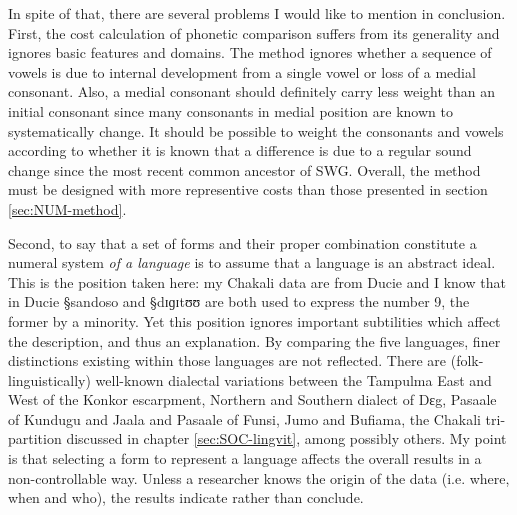 In spite of that, there are several problems I would like to mention in
conclusion.   First, the cost
calculation of phonetic comparison suffers from its generality and ignores
basic features and domains. The method ignores 
whether a sequence of vowels is due to internal
development from a single vowel or loss of a medial consonant.  Also,  a
medial consonant
should definitely carry less weight than an initial consonant since  many
consonants in medial position are known to systematically change. It should be
possible to weight the consonants and vowels according to whether it is known
that
a difference is due to a regular sound change since the most recent common
ancestor of SWG.  Overall, the method must be designed with 
more representive  costs than those presented in section \ref{sec:NUM-method}. 


Second, to say that a set of forms and their proper combination constitute a
numeral system {\it of a language} is to assume that a language is an abstract
ideal. This is the position taken here: my Chakali data are from Ducie
and I know that in Ducie {\S sandoso} and {\S dɪɡɪtʊʊ} are both used to
express the number 9,  the former by a minority.  Yet this position ignores
important subtilities which  affect the  description, and thus an
explanation. By comparing the five languages,   
finer distinctions existing within those languages are not reflected. There
are 
(folk-linguistically) well-known dialectal variations between the Tampulma East
and West of
the Konkor escarpment, Northern and Southern dialect of Dɛg,  Pasaale of Kundugu
and
Jaala and Pasaale of Funsi, Jumo and Bufiama, the Chakali tri-partition
discussed in chapter \ref{sec:SOC-lingvit}, among possibly  others.
My  point is that selecting a form to
represent a language affects the overall results in a non-controllable way. 
Unless a researcher knows
the origin of the data (i.e. where, when and who), the results 
indicate
rather than conclude. 






